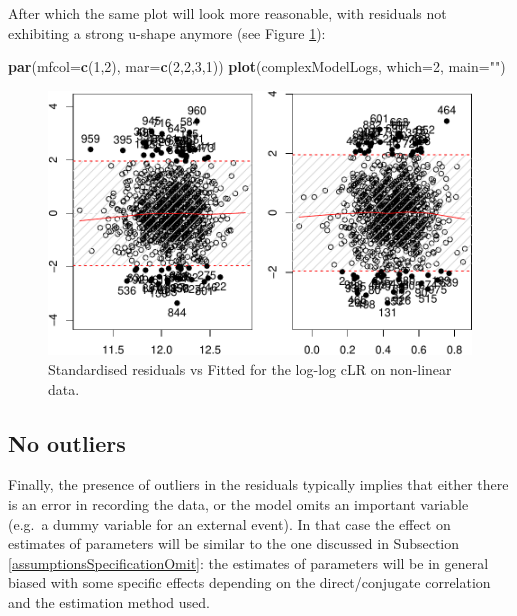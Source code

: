 \documentclass[
]{book}
\newenvironment{Shaded}{\begin{snugshade}}{\end{snugshade}}
\newcommand{\DataTypeTok}[1]{\textcolor[rgb]{0.13,0.29,0.53}{#1}}
\newcommand{\DecValTok}[1]{\textcolor[rgb]{0.00,0.00,0.81}{#1}}
\newcommand{\KeywordTok}[1]{\textcolor[rgb]{0.13,0.29,0.53}{\textbf{#1}}}
\newcommand{\NormalTok}[1]{#1}
\newcommand{\StringTok}[1]{\textcolor[rgb]{0.31,0.60,0.02}{#1}}
\begin{document}
After which the same plot will look more reasonable, with residuals not exhibiting a strong u-shape anymore (see Figure \ref{fig:nonlinearStdResid}):

\begin{Shaded}
\begin{Highlighting}[]
\KeywordTok{par}\NormalTok{(}\DataTypeTok{mfcol=}\KeywordTok{c}\NormalTok{(}\DecValTok{1}\NormalTok{,}\DecValTok{2}\NormalTok{), }\DataTypeTok{mar=}\KeywordTok{c}\NormalTok{(}\DecValTok{2}\NormalTok{,}\DecValTok{2}\NormalTok{,}\DecValTok{3}\NormalTok{,}\DecValTok{1}\NormalTok{))}
\KeywordTok{plot}\NormalTok{(complexModelLogs, }\DataTypeTok{which=}\DecValTok{2}\NormalTok{, }\DataTypeTok{main=}\StringTok{""}\NormalTok{)}
\end{Highlighting}
\end{Shaded}

\begin{figure}
\centering
\includegraphics{Svetunkov---Svetunkov---Complex-Valued-Econometrics_files/figure-latex/nonlinearStdResid-1.pdf}
\caption{\label{fig:nonlinearStdResid}Standardised residuals vs Fitted for the log-log cLR on non-linear data.}
\end{figure}

\hypertarget{assumptionsSpecificationOutlier}{%
\subsection{No outliers}\label{assumptionsSpecificationOutlier}}

Finally, the presence of outliers in the residuals typically implies that either there is an error in recording the data, or the model omits an important variable (e.g.~a dummy variable for an external event). In that case the effect on estimates of parameters will be similar to the one discussed in Subsection \ref{assumptionsSpecificationOmit}: the estimates of parameters will be in general biased with some specific effects depending on the direct/conjugate correlation and the estimation method used.
\end{document}
